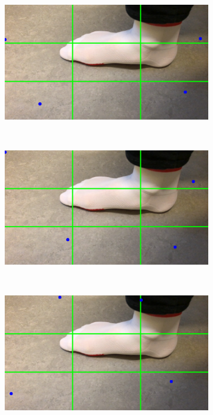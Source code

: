 \documentclass{kththesis}
\begin{document}
\begin{figure}[h]
    \centering
    \begin{subfigure}[b]{0.3\textwidth}
        \includegraphics[width=\textwidth]{orig1}
    \end{subfigure}
    ~ %
    \begin{subfigure}[b]{0.3\textwidth}
        \includegraphics[width=\textwidth]{orig2}
      \end{subfigure}
    ~
    \begin{subfigure}[b]{0.3\textwidth}
        \includegraphics[width=\textwidth]{orig3}
      \end{subfigure}


\end{figure}
\end{document}
